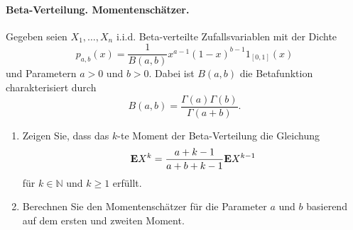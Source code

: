 \paragraph{Beta-Verteilung. Momentenschätzer.} Gegeben seien $X_1, \ldots, X_n$ i.i.d. Beta-verteilte
Zufallsvariablen mit der Dichte
\begin{equation*}
    p_{a,b}(x) = \frac{1}{B(a,b)} x^{a-1} (1-x)^{b-1} 1_{ \left[ 0,1 \right]  } (x)
\end{equation*}
und Parametern $a>0$ und $b>0$. Dabei ist $B(a,b)$ die Betafunktion charakterisiert durch
\begin{equation*}
    B(a,b) = \frac{\Gamma(a)\Gamma(b)}{\Gamma(a+b)}.
\end{equation*}
\begin{enumerate}
    \item Zeigen Sie, dass das $k$-te Moment der Beta-Verteilung die Gleichung
        \begin{equation*}
            \mathbf{E} X^{k} = \frac{a+k-1}{a+b+k-1} \mathbf{E} X^{k-1}
        \end{equation*}
        für $k\in \mathbb N$ und $k\geq 1$ erfüllt. 
    \item Berechnen Sie den Momentenschätzer für die Parameter $a$ und $b$ basierend auf dem ersten und zweiten Moment.
\end{enumerate}

